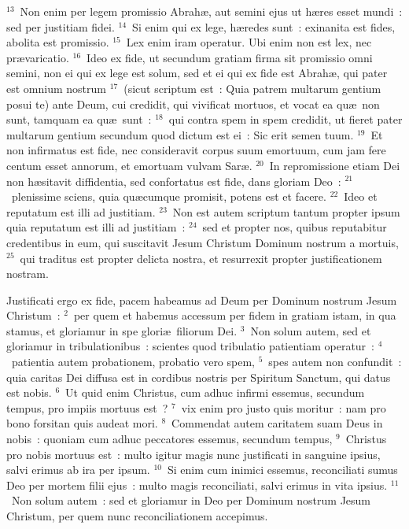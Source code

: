 ${}^{13}$~Non enim per legem promissio Abrah\ae , aut semini ejus ut h\ae res esset mundi~: sed per justitiam fidei.
${}^{14}$~Si enim qui ex lege, h\ae redes sunt~: exinanita est fides, abolita est promissio.
${}^{15}$~Lex enim iram operatur. Ubi enim non est lex, nec pr\ae varicatio.
${}^{16}$~Ideo ex fide, ut secundum gratiam firma sit promissio omni semini, non ei qui ex lege est solum, sed et ei qui ex fide est Abrah\ae , qui pater est omnium nostrum
${}^{17}$~(sicut scriptum est~: Quia patrem multarum gentium posui te) ante Deum, cui credidit, qui vivificat mortuos, et vocat ea qu\ae\ non sunt, tamquam ea qu\ae\ sunt~:
${}^{18}$~qui contra spem in spem credidit, ut fieret pater multarum gentium secundum quod dictum est ei~: Sic erit semen tuum.
${}^{19}$~Et non infirmatus est fide, nec consideravit corpus suum emortuum, cum jam fere centum esset annorum, et emortuam vulvam Sar\ae .
${}^{20}$~In repromissione etiam Dei non h\ae sitavit diffidentia, sed confortatus est fide, dans gloriam Deo~:
${}^{21}$~plenissime sciens, quia qu\ae cumque promisit, potens est et facere.
${}^{22}$~Ideo et reputatum est illi ad justitiam.
${}^{23}$~Non est autem scriptum tantum propter ipsum quia reputatum est illi ad justitiam~:
${}^{24}$~sed et propter nos, quibus reputabitur credentibus in eum, qui suscitavit Jesum Christum Dominum nostrum a mortuis,
${}^{25}$~qui traditus est propter delicta nostra, et resurrexit propter justificationem nostram.

\lettrine[lines=3,image=true,loversize=0.05,lraise=-0.03]{J}{}ustificati ergo ex fide, pacem habeamus ad Deum per Dominum nostrum Jesum Christum~:
${}^{2}$~per quem et habemus accessum per fidem in gratiam istam, in qua stamus, et gloriamur in spe glori\ae\ filiorum Dei.
${}^{3}$~Non solum autem, sed et gloriamur in tribulationibus~: scientes quod tribulatio patientiam operatur~:
${}^{4}$~patientia autem probationem, probatio vero spem,
${}^{5}$~spes autem non confundit~: quia caritas Dei diffusa est in cordibus nostris per Spiritum Sanctum, qui datus est nobis.
${}^{6}$~Ut quid enim Christus, cum adhuc infirmi essemus, secundum tempus, pro impiis mortuus est~?
${}^{7}$~vix enim pro justo quis moritur~: nam pro bono forsitan quis audeat mori.
${}^{8}$~Commendat autem caritatem suam Deus in nobis~: quoniam cum adhuc peccatores essemus, secundum tempus,
${}^{9}$~Christus pro nobis mortuus est~: multo igitur magis nunc justificati in sanguine ipsius, salvi erimus ab ira per ipsum.
${}^{10}$~Si enim cum inimici essemus, reconciliati sumus Deo per mortem filii ejus~: multo magis reconciliati, salvi erimus in vita ipsius.
${}^{11}$~Non solum autem~: sed et gloriamur in Deo per Dominum nostrum Jesum Christum, per quem nunc reconciliationem accepimus.


